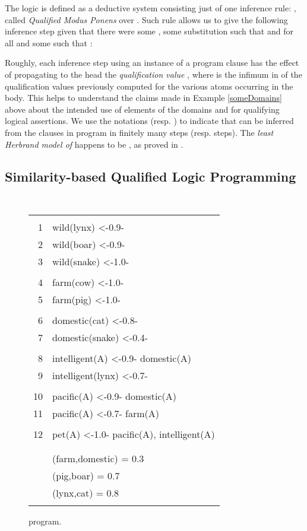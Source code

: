 \documentclass{sigplanconf}
\theoremstyle{definition}
\theoremstyle{plain}
\begin{document}
The logic  is defined as a deductive system consisting just of one inference rule: , called \emph{Qualified Modus Ponens} over . Such rule allows us to give the following inference step given that there were some , some substitution  such that  and  for all  and some  such that :

Roughly, each  inference step using an instance of a program clause  has the effect of propagating to the head the {\em qualification value} , where  is the infimum in  of the qualification values   previously computed for the various atoms occurring in the body. This helps to understand the claims made in Example \ref{someDomains} above about the intended use of elements of the domains  and  for qualifying logical assertions. We use the notations  (resp. ) to indicate that  can be inferred from the clauses in program  in finitely many steps (resp.  steps). The \emph{least Herbrand model of } happens to be , as proved in \cite{RR08}.

\subsection{Similarity-based Qualified Logic Programming} \label{SQLP}

\begin{figure}
\begin{center}
\tt
\begin{tabular}{|r@{\hspace{0.2cm}}l|}
\hline
&\\
\scriptsize 1 & wild(lynx) <-0.9- \\
\scriptsize 2 & wild(boar) <-0.9- \\
\scriptsize 3 & wild(snake) <-1.0- \\
&\\
\scriptsize 4 & farm(cow) <-1.0- \\
\scriptsize 5 & farm(pig) <-1.0- \\
&\\
\scriptsize 6 & domestic(cat) <-0.8- \\
\scriptsize 7 & domestic(snake) <-0.4- \\
&\\
\scriptsize 8 & intelligent(A) <-0.9- domestic(A) \\
\scriptsize 9 & intelligent(lynx) <-0.7- \\
&\\
\scriptsize 10 & pacific(A) <-0.9- domestic(A) \\
\scriptsize 11 & pacific(A) <-0.7- farm(A) \\
&\\
\scriptsize 12 & pet(A) <-1.0- pacific(A), intelligent(A) \\
&\\
\hline
&\\
&(farm,domestic) = 0.3 \\
&(pig,boar) = 0.7 \\
&(lynx,cat) = 0.8 \\
&\\
\hline
\end{tabular}
\end{center}
\caption{ program.\label{fig:example}}
\end{figure}
\end{document}

